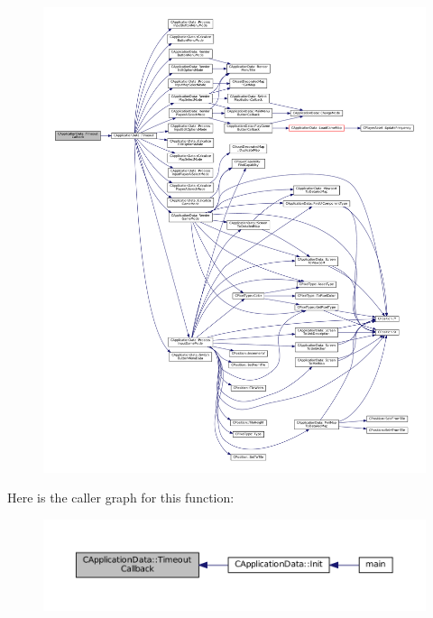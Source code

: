 \begin{figure}[H]
\begin{center}
\leavevmode
\includegraphics[width=350pt]{classCApplicationData_af66e15f6935f053b46a11aaa51a869c9_cgraph}
\end{center}
\end{figure}
Here is the caller graph for this function\+:
\nopagebreak
\begin{figure}[H]
\begin{center}
\leavevmode
\includegraphics[width=350pt]{classCApplicationData_af66e15f6935f053b46a11aaa51a869c9_icgraph}
\end{center}
\end{figure}
\hypertarget{classCApplicationData_aad04c7da1cc86bef623efda1019907fd}{}\label{classCApplicationData_aad04c7da1cc86bef623efda1019907fd} 
